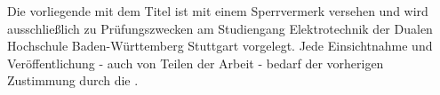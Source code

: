 \thispagestyle{empty}
Die vorliegende {\projectType} mit dem Titel {\projectTitle}
ist mit einem Sperrvermerk versehen und wird ausschließlich zu Prüfungszwecken
am Studiengang Elektrotechnik der Dualen Hochschule Baden-Württemberg
Stuttgart vorgelegt. Jede Einsichtnahme und Veröffentlichung - auch von
Teilen der Arbeit - bedarf der vorherigen Zustimmung durch die {\company}.
